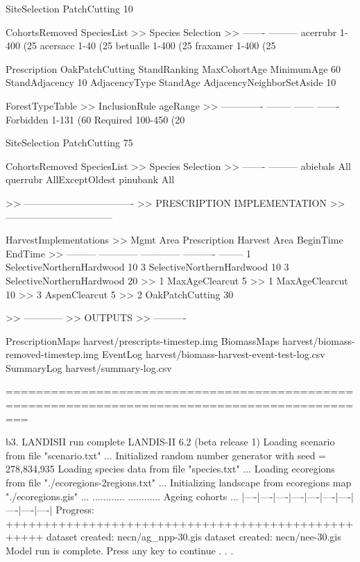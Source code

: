     SiteSelection PatchCutting 10%

    CohortsRemoved SpeciesList
>>	Species		Selection
>>	-------		---------
	acerrubr   	1-400 (25%
	acersacc   	1-40 (25%
	betualle   	1-400 (25%
	fraxamer   	1-400 (25%



Prescription    OakPatchCutting
    StandRanking		MaxCohortAge
    MinimumAge  		60
    StandAdjacency		10
    AdjacencyType 		StandAge
    AdjacencyNeighborSetAside	10

   ForestTypeTable
>>	InclusionRule	ageRange	%
>> 	-------------	--------	------	-------
	Forbidden	1-131		(60%
	Required	100-450		(20%
	
    SiteSelection	PatchCutting	75%

    CohortsRemoved	SpeciesList
>>	Species		Selection
>>	------- 	---------
	abiebals 	All
	querrubr 	AllExceptOldest
	pinubank 	All



>> ----------------------------------
>> PRESCRIPTION IMPLEMENTATION 
>> ---------------------------------

    HarvestImplementations
>>	Mgmt Area	Prescription		Harvest Area	BeginTime	EndTime
>> 	---------   	------------   		------------   	---------- 	--------
	1		SelectiveNorthernHardwood	10%
	3		SelectiveNorthernHardwood	10%
	3		SelectiveNorthernHardwood	20%
>>	1		MaxAgeClearcut			5%
>>	1		MaxAgeClearcut			10%
>>	3		AspenClearcut			5%
>>	2		OakPatchCutting			30%


	
>> ------------
>> OUTPUTS
>> ----------

PrescriptionMaps    harvest/prescripts-{timestep}.img
BiomassMaps         harvest/biomass-removed-{timestep}.img
EventLog            harvest/biomass-harvest-event-test-log.csv
SummaryLog	    harvest/summary-log.csv

===============================================================================================



	b3. LANDISII run complete
LANDIS-II 6.2 (beta release 1)
Loading scenario from file "scenario.txt" ...
Initialized random number generator with seed = 278,834,935
Loading species data from file "species.txt" ...
Loading ecoregions from file "./ecoregions-2regions.txt" ...
Initializing landscape from ecoregions map "./ecoregions.gis" ...
............
............
Ageing cohorts ...
          |----|----|----|----|----|----|----|----|----|----|
Progress: +++++++++++++++++++++++++++++++++++++++++++++++++++
dataset created: necn/ag_npp-30.gis
dataset created: necn/nee-30.gis
Model run is complete.
Press any key to continue . . .





